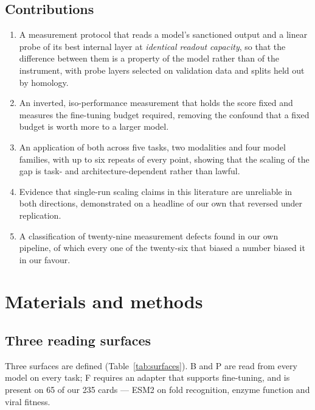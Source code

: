 \documentclass[11pt]{article}
\begin{document}
\subsection{Contributions}

\begin{enumerate}
\itemsep2pt
\item A measurement protocol that reads a model's sanctioned output and a linear
probe of its best internal layer at \emph{identical readout capacity}, so that the
difference between them is a property of the model rather than of the instrument,
with probe layers selected on validation data and splits held out by homology.
\item An inverted, iso-performance measurement that holds the score fixed and
measures the fine-tuning budget required, removing the confound that a fixed
budget is worth more to a larger model.
\item An application of both across five tasks, two modalities and four model
families, with up to six repeats of every point, showing that the scaling of the
gap is task- and architecture-dependent rather than lawful.
\item Evidence that single-run scaling claims in this literature are unreliable in
both directions, demonstrated on a headline of our own that reversed under
replication.
\item A classification of twenty-nine measurement defects found in our own
pipeline, of which every one of the twenty-six that biased a number biased it in
our favour.
\end{enumerate}

\section{Materials and methods}

\subsection{Three reading surfaces}

Three surfaces are defined (Table~\ref{tab:surfaces}). B and P are read from
every model on every task; F
requires an adapter that supports fine-tuning, and is present on 65 of our 235
cards --- ESM2 on fold recognition, enzyme function and viral fitness.
\end{document}
